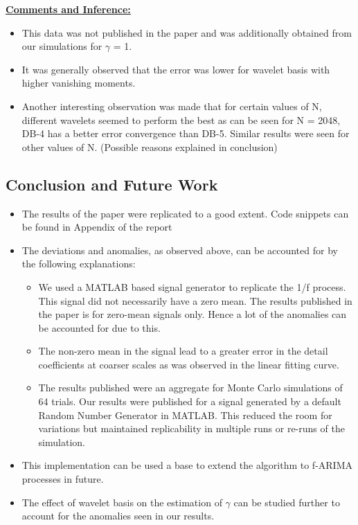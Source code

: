 \documentclass[a4paper]{article}
\begin{document}
\underline{\textbf{Comments and Inference:}}
\begin{itemize}
\item This data was not published in the paper and was additionally obtained from our simulations for $\gamma$ = 1.
\item It was generally observed that the error was lower for wavelet basis with higher vanishing moments.
\item Another interesting observation was made that for certain values of N, different wavelets seemed to perform the best as can be seen for N = 2048, DB-4 has a better error convergence than DB-5. Similar results were seen for other values of N. (Possible reasons explained in conclusion)
\end{itemize}

\subsection{Conclusion and Future Work}
\begin{itemize}
\item The results of the paper were replicated to a good extent. Code snippets can be found in Appendix of the report
\item The deviations and anomalies, as observed above, can be accounted for by the following explanations:
\begin{itemize}
\item We used a MATLAB based signal generator to replicate the 1/f process. This signal did not necessarily have a zero mean. The results published in the paper is for zero-mean signals only. Hence a lot of the anomalies can be accounted for due to this.
\item The non-zero mean in the signal lead to a greater error in the detail coefficients at coarser scales as was observed in the linear fitting curve.
\item The results published were an aggregate for Monte Carlo simulations of 64 trials. Our results were published for a signal generated by a  default Random Number Generator in MATLAB. This reduced the room for variations but maintained replicability in multiple runs or re-runs of the simulation.
\end{itemize}
\item This implementation can be used a base to extend the algorithm to f-ARIMA processes in future.
\item The effect of wavelet basis on the estimation of $\gamma$ can be studied further to account for the anomalies seen in our results. 
\end{itemize}



\end{document}
